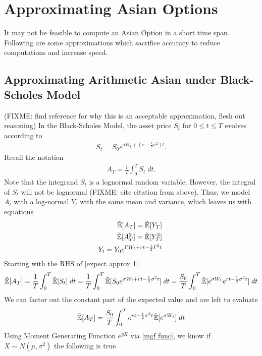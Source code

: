 \documentclass[reqno]{amsart}
\newcommand{\rE}[1]{\tilde{\E}[#1]}
\begin{document}
\section{Approximating Asian Options}
It may not be feasible to compute an Asian Option in a short time span.
Following are some approximations which sacrifice accuracy to reduce computations and increase speed.

\subsection{Approximating Arithmetic Asian under Black-Scholes Model}
(FIXME: find reference for why this is an acceptable approximation, flesh out reasoning)
In the Black-Scholes Model, the asset price $S_t$ for $0\leq t \leq T$ evolves according to
\begin{align} 
     S_t = S_0e^{\sigma W_t+(r - \frac{1}{2} \sigma^2)t}.
\end{align}
Recall the notation
\begin{align}
     A_T = \frac{1}{T}\int_0^T S_t \; dt.
\end{align}
Note that the integrand $S_t$ is a lognormal random variable.
However, the integral of $S_t$ will not be lognormal (FIXME: cite citation from above).
Thus, we model $A_t$ with a log-normal $Y_t$ with the same mean and variance, which leaves us with equations
\begin{align} \label{expect approx 1}
     \tilde{\mathbb{E}}[A_T] = \tilde{\mathbb{E}}[Y_T] \; \\
     \label{expect approx 2}
     \tilde{\mathbb{E}}[A_T^2] = \tilde{\mathbb{E}}[Y_T^2] \; \\
     Y_t = Y_0e^{\Gamma W_t+rt-\frac{1}{2}\Gamma^2t} \;
\end{align}
Starting with the RHS of \eqref{expect approx 1}
\begin{align} 
     \rE{A_T} 
     = \frac{1}{T} \int_0^T \tilde{\E}[S_t] \; dt 
     = \frac{1}{T} \int_0^T \tilde{\E}[S_0 e^{\sigma W_t+rt-\frac{1}{2}\sigma^2t}] \; dt
     = \frac{S_0}{T} \int_0^T\rE{e^{\sigma W_t}e^{rt-\frac{1}{2}\sigma^2t}} \; dt
\end{align}
We can factor out the constant part of the expected value and are left to evaluate
\begin{align} \label{simplified expected A_T}
     \rE{A_T} = \frac{S_0}{T} \int_0^T e^{rt-\frac{1}{2}\sigma^2t} \rE{e^{\sigma W_t}}  \; dt
\end{align}
Using Moment Generating Function $e^{yX}$ via \eqref{mgf func}, we know if $X \sim N(\mu, \sigma^2)$ the following is true
\end{document}

